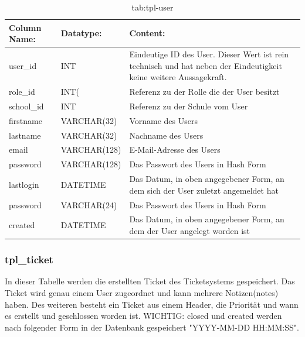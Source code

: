 \begin{table}[h]
	\begin{tabular}{|p{3.5cm}|p{4cm}|p{6.2cm}|}
		\hline
		\textbf{Column Name:} & \textbf{Datatype:} & \textbf{Content:}\\
		\hline
		user\_id & INT & Eindeutige ID des User. Dieser Wert ist rein technisch und hat  neben der Eindeutigkeit keine weitere Aussagekraft.\\
		\hline
		role\_id & INT( & Referenz zu der Rolle die der User besitzt\\
		\hline
		school\_id & INT &  Referenz zu der Schule vom User \\
		\hline
		firstname & VARCHAR(32) & Vorname des Users\\
		\hline
		lastname & VARCHAR(32) & Nachname des Users\\
		\hline
		email & VARCHAR(128) & E-Mail-Adresse des Users\\
		\hline
		password & VARCHAR(128) & Das Passwort des Users in Hash Form \\
		\hline
		lastlogin & DATETIME & Das Datum, in oben angegebener Form, an dem sich der User zuletzt angemeldet hat \\
		\hline
		password & VARCHAR(24) & Das Passwort des Users in Hash Form \\
		\hline
		created & DATETIME & Das Datum, in oben angegebener Form, an dem der User angelegt worden ist\\
		\hline
	\end{tabular}
	\caption{tab:tpl-user}
\end{table}
\label{tab:tpl_user}

\newpage

\subsubsection{tpl\_ticket}

In dieser Tabelle werden die erstellten Ticket des Ticketsystems gespeichert. Das Ticket wird genau einem User zugeordnet und kann mehrere Notizen(notes) haben. Des weiteren besteht ein Ticket aus einem Header, die Priorität und wann es erstellt und geschlossen worden ist.
WICHTIG: closed und created werden nach folgender Form in der Datenbank gespeichert "YYYY-MM-DD HH:MM:SS".

